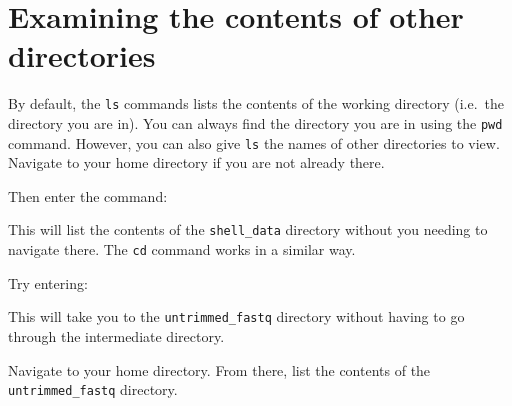 \documentclass[
  letterpaper,
  DIV=11,
  numbers=noendperiod]{scrreprt}
\newenvironment{Shaded}{\begin{snugshade}}{\end{snugshade}}
\newcommand{\ExtensionTok}[1]{\textcolor[rgb]{0.00,0.23,0.31}{#1}}
\newcommand{\NormalTok}[1]{\textcolor[rgb]{0.00,0.23,0.31}{#1}}
\begin{document}
\section{Examining the contents of other
directories}\label{examining-the-contents-of-other-directories}

By default, the \texttt{ls} commands lists the contents of the working
directory (i.e.~the directory you are in). You can always find the
directory you are in using the \texttt{pwd} command. However, you can
also give \texttt{ls} the names of other directories to view. Navigate
to your home directory if you are not already there.

\begin{Shaded}
\end{Shaded}

Then enter the command:

\begin{Shaded}
\end{Shaded}

This will list the contents of the \texttt{shell\_data} directory
without you needing to navigate there. The \texttt{cd} command works in
a similar way.

Try entering:

\begin{Shaded}
\end{Shaded}

This will take you to the \texttt{untrimmed\_fastq} directory without
having to go through the intermediate directory.

\begin{tcolorbox}[enhanced jigsaw, opacitybacktitle=0.6, colback=white, coltitle=black, opacityback=0, rightrule=.15mm, toptitle=1mm, toprule=.15mm, bottomtitle=1mm, colframe=quarto-callout-caution-color-frame, arc=.35mm, titlerule=0mm, colbacktitle=quarto-callout-caution-color!10!white, leftrule=.75mm, title={Exercise}, breakable, bottomrule=.15mm, left=2mm]

Navigate to your home directory. From there, list the contents of the
\texttt{untrimmed\_fastq} directory.

\end{tcolorbox}
\end{document}
